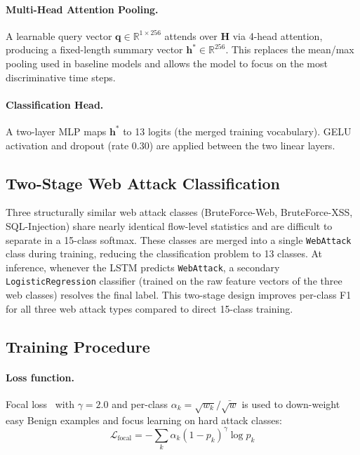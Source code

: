 \documentclass[12pt]{article}
\theoremstyle{plain}
\begin{document}
\paragraph{Multi-Head Attention Pooling.}
A learnable query vector $\mathbf{q} \in \mathbb{R}^{1 \times 256}$ attends over $\mathbf{H}$ via 4-head attention, producing a fixed-length summary vector $\mathbf{h}^* \in \mathbb{R}^{256}$. This replaces the mean/max pooling used in baseline models and allows the model to focus on the most discriminative time steps.

\paragraph{Classification Head.}
A two-layer MLP maps $\mathbf{h}^*$ to 13 logits (the merged training vocabulary). GELU activation and dropout (rate 0.30) are applied between the two linear layers.

\subsection{Two-Stage Web Attack Classification}
\label{sec:websplitter}

Three structurally similar web attack classes (BruteForce-Web, BruteForce-XSS, SQL-Injection) share nearly identical flow-level statistics and are difficult to separate in a 15-class softmax. These classes are merged into a single \texttt{WebAttack} class during training, reducing the classification problem to 13 classes. At inference, whenever the LSTM predicts \texttt{WebAttack}, a secondary \texttt{LogisticRegression} classifier (trained on the raw feature vectors of the three web classes) resolves the final label. This two-stage design improves per-class F1 for all three web attack types compared to direct 15-class training.

\subsection{Training Procedure}

\paragraph{Loss function.}
Focal loss~\cite{focal_loss} with $\gamma = 2.0$ and per-class $\alpha_k = \sqrt{w_k} / \bar{\sqrt{w}}$ is used to down-weight easy Benign examples and focus learning on hard attack classes:
\begin{equation}
\mathcal{L}_\text{focal} = -\sum_{k} \alpha_k (1 - p_k)^\gamma \log p_k
\end{equation}
\end{document}
